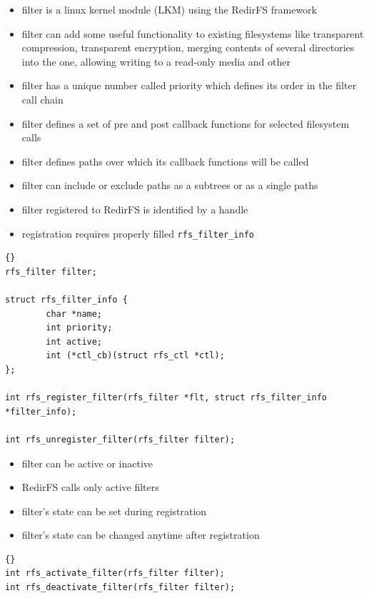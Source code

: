 \documentclass[30pt,a4paper,landscape,headrule,footrule]{foils}
\begin{document}

\begin{itemize}
\item filter is a linux kernel module (LKM) using the RedirFS framework
\item filter can add some useful functionality to existing filesystems like
transparent compression, transparent encryption, merging contents of several
directories into the one, allowing writing to a read-only media and other
\item filter has a unique number called priority which defines its order in the
filter call chain
\end{itemize}

\begin{itemize}
\item filter defines a set of pre and post callback functions for selected
filesystem calls
\item filter defines paths over which its callback functions will be called
\item filter can include or exclude paths as a subtrees or as a single paths
\end{itemize}

\begin{itemize}
\item filter registered to RedirFS is identified by a handle
\item registration requires properly filled \texttt{rfs\_filter\_info}
\end{itemize}

\begin{lstlisting}[frame=trbl]{}
rfs_filter filter;

struct rfs_filter_info {
        char *name;
        int priority;
        int active;
        int (*ctl_cb)(struct rfs_ctl *ctl);
};

int rfs_register_filter(rfs_filter *flt, struct rfs_filter_info *filter_info);

int rfs_unregister_filter(rfs_filter filter);
\end{lstlisting}

\begin{itemize}
\item filter can be active or inactive
\item RedirFS calls only active filters
\item filter's state can be set during registration
\item filter's state can be changed anytime after registration
\end{itemize}
\begin{lstlisting}[frame=trbl]{}
int rfs_activate_filter(rfs_filter filter);
int rfs_deactivate_filter(rfs_filter filter);
\end{lstlisting}
\end{document}
